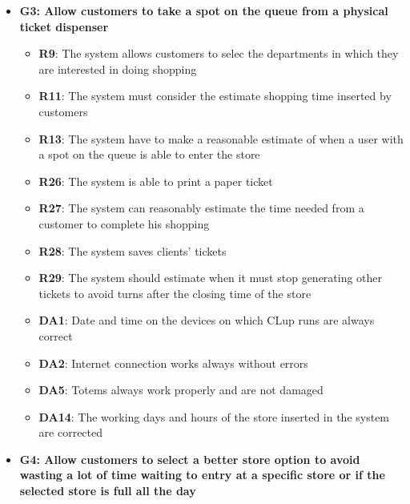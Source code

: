 \documentclass{article}
\begin{document}
\begin{itemize}
				\item {\bfseries G3: Allow customers to take a spot on the queue from a physical ticket dispenser}	

					\begin{itemize}
						
						\item {\bfseries R9}: The system allows customers to selec the departments in which they are interested in doing shopping
						\item {\bfseries R11}: The system must consider the estimate shopping time inserted by customers
						\item {\bfseries R13}: The system have to make a reasonable estimate of when a user with a spot on the queue is able to enter the store
						\item {\bfseries R26}: The system is able to print a paper ticket
						\item {\bfseries R27}: The system can reasonably estimate the time needed from a customer to complete his shopping
						\item {\bfseries R28}: The system saves clients' tickets
						\item {\bfseries R29}: The system should estimate when it must stop generating other tickets to	avoid turns after the closing time of the store \\
		
						\item {\bfseries DA1}: Date and time on the devices on which CLup runs are always correct
						\item {\bfseries DA2}: Internet connection works always without errors
						\item {\bfseries DA5}: Totems always work properly and are not damaged
						\item {\bfseries DA14}: The working days and hours of the store inserted in the system are corrected
						
					\end{itemize}

				\item {\bfseries G4: Allow customers to select a better store option to avoid wasting a lot of time waiting to entry at a specific store or if the selected store is full all the day}	

					\begin{itemize}
						

\end{itemize}
\end{itemize}
\end{document}
